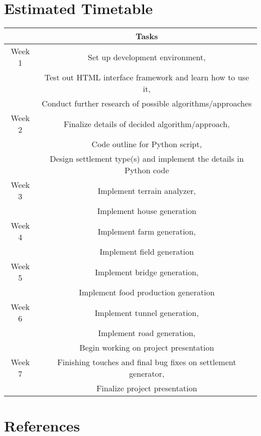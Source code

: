 \documentclass[11pt, oneside]{article}
\begin{document}
\newpage


\section{Estimated Timetable}
\label{estimatedTimetable}

\begin{center}
\begin{tabular}{| c | c |} 
 	\hline
 	  & Tasks \\ [0.5ex] 
 	\hline\hline
	Week 1 & Set up development environment, \\
	 & Test out HTML interface framework and learn how to use it, \\
	 & Conduct further research of possible algorithms/approaches \\
	\hline
	Week 2 & Finalize details of decided algorithm/approach, \\
	 & Code outline for Python script, \\
	 & Design settlement type(s) and implement the details in Python code \\
	\hline
	Week 3 & Implement terrain analyzer, \\ 
	 & Implement house generation \\
	\hline
	Week 4 & Implement farm generation, \\ 
	 & Implement field generation \\
	\hline
	Week 5 & Implement bridge generation, \\
	 & Implement food production generation \\
	\hline
	Week 6 & Implement tunnel generation, \\
	 & Implement road generation, \\
	 & Begin working on project presentation \\
	\hline
	Week 7 & Finishing touches and final bug fixes on settlement generator, \\
	 & Finalize project presentation \\
	\hline
\end{tabular}
\end{center}

\newpage


\section{References}
\label{references}
\nocite{*}
\printbibliography[heading=none]
\end{document}
